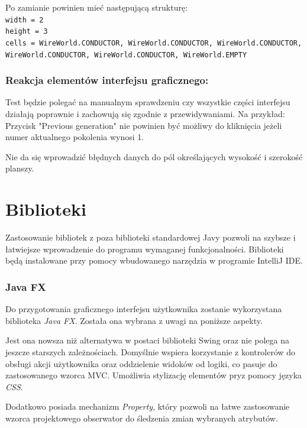 \documentclass{report}
\begin{document}
Po zamianie powinien mieć następującą strukturę:\\

\noindent \texttt{width = 2}\\
\texttt{height = 3}\\
\texttt{cells = {WireWorld.CONDUCTOR, WireWorld.CONDUCTOR, WireWorld.CONDUCTOR, WireWorld.CONDUCTOR, WireWorld.CONDUCTOR, WireWorld.EMPTY}}\\

\subsection{Reakcja elementów interfejsu graficznego:}
Test będzie polegać na manualnym sprawdzeniu czy wszystkie części interfejsu działają poprawnie i zachowują się zgodnie z przewidywaniami. Na przykład:\\

Przycisk "Previous generation" nie powinien być możliwy do kliknięcia jeżeli numer aktualnego pokolenia wynosi 1.

Nie da się wprowadzić błędnych danych do pól określających wysokość i szerokość planszy.


\chapter{Biblioteki}
Zastosowanie bibliotek z poza biblioteki standardowej Javy pozwoli na szybsze i łatwiejsze wprowadzenie do programu wymaganej funkcjonalności. Biblioteki będą instalowane przy pomocy wbudowanego narzędzia w programie IntelliJ IDE.

\subsection{Java FX}
Do przygotowania graficznego interfejsu użytkownika zostanie wykorzystana biblioteka \textit{Java FX}. Została ona wybrana z uwagi na poniższe aspekty.

Jest ona nowsza niż alternatywa w postaci biblioteki Swing oraz nie polega na jeszcze starszych zależnościach.
Domyślnie wspiera korzystanie z kontrolerów do obsługi akcji użytkownika oraz oddzielenie widoków od logiki, co pasuje do zastosowanego wzorca MVC.
Umożliwia stylizację elementów pryz pomocy języka \textit{CSS}.

Dodatkowo posiada mechanizm \textit{Property}, który pozwoli na łatwe zastosowanie wzorca projektowego obserwator do śledzenia zmian wybranych atrybutów.
\end{document}

